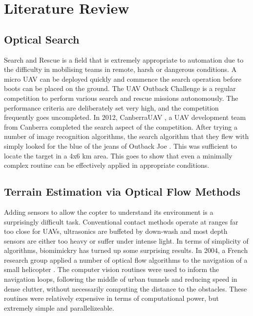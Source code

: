 \documentclass[a4paper, 11pt, titlepage]{article}
\begin{document}
  \section{Literature Review}

    \subsection{Optical Search}
      Search and Rescue is a field that is extremely appropriate to automation due to the difficulty in mobilising teams in remote, harsh or dangerous conditions.  A micro UAV can be deployed quickly and commence the search operation before boots can be placed on the ground.
      The UAV Outback Challenge \cite{OutbackChallenge} is a regular competition to perform various search and rescue missions autonomously.  The performance criteria are deliberately set very high, and the competition frequently goes uncompleted.  
      In 2012, CanberraUAV \cite{canberrauav}, a UAV development team from Canberra completed the search aspect of the competition.
      After trying a number of image recognition algorithms, the search algorithm that they flew with simply looked for the blue of the jeans of Outback Joe \cite{tridge}. This was sufficient to locate the target in a 4x6 km area.  This goes to show that even a minimally complex routine can be effectively applied in appropriate conditions.

    \subsection{Terrain Estimation via Optical Flow Methods}
      Adding sensors to allow the copter to understand its environment is a surprisingly difficult task.  Conventional contact methods operate at ranges far too close for UAVs, ultrasonics are buffeted by down-wash and most depth sensors are either too heavy or suffer under intense light.
      In terms of simplicity of algorithms, biomimickry has turned up some surprising results.  In 2004, a French research group applied a number of optical flow algorithms to the navigation of a small helicopter \cite{InsectFlowMethods}.  The computer vision routines were used to inform the navigation loops, following the middle of urban tunnels and reducing speed in dense clutter, without necessarily computing the distance to the obstacles.  These routines were relatively expensive in terms of computational power, but extremely simple and parallelizeable.
\end{document}
